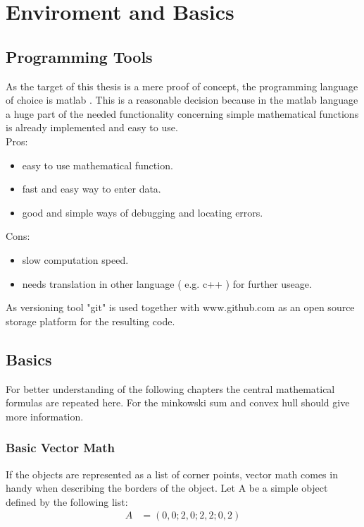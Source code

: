 \chapter{Enviroment and Basics}
\label{cha:enviromentandbasics}

\section{Programming Tools}
As the target of this thesis is a mere proof of concept, the programming language of choice is matlab \cite{tool:matlab}. This is a reasonable decision because in the matlab language a huge part of the needed functionality concerning simple mathematical functions is already implemented and easy to use. \\
Pros:
\begin{itemize}
\item easy to use mathematical function.
\item fast and easy way to enter data.
\item good and simple ways of debugging and locating errors.
\end{itemize}
Cons:
\begin{itemize}
\item slow computation speed.
\item needs translation in other language ( e.g. c++ ) for further useage.
\end{itemize}

As versioning tool "git" \cite{tool:git} is used together with www.github.com as an open source storage platform for the resulting code.

\section{Basics}
For better understanding of the following chapters the central mathematical formulas are repeated here.
For the minkowski sum and convex hull \cite{minkowski} should give more information.
\subsection{Basic Vector Math} %
If the objects are represented as a list of corner points, vector math comes in handy when describing the borders of the object.
Let A be a simple object defined by the following list:
\begin{align*}
A &= 	( 0 , 0 ;2 , 0 ;2, 2; 0, 2)	
\end{align*}

